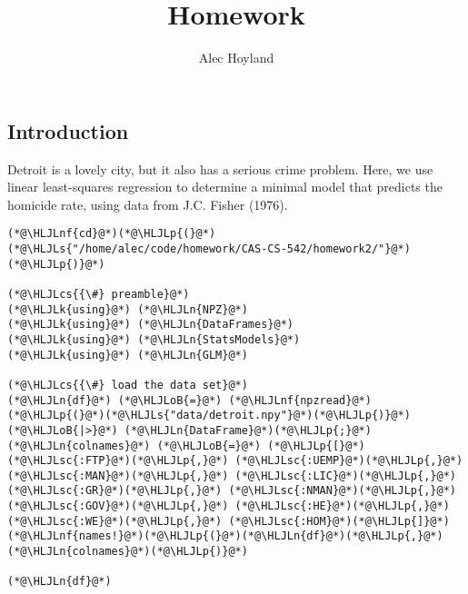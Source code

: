 \documentclass[12pt,a4paper]{article}
\title{ Homework }
\author{ Alec Hoyland }
\newcommand{\HLJLk}[1]{\textcolor[RGB]{148,91,176}{\textbf{#1}}}
\newcommand{\HLJLn}[1]{#1}
\newcommand{\HLJLnf}[1]{\textcolor[RGB]{66,102,213}{#1}}
\newcommand{\HLJLs}[1]{\textcolor[RGB]{201,61,57}{#1}}
\newcommand{\HLJLsc}[1]{\textcolor[RGB]{201,61,57}{#1}}
\newcommand{\HLJLoB}[1]{\textcolor[RGB]{102,102,102}{\textbf{#1}}}
\newcommand{\HLJLp}[1]{#1}
\newcommand{\HLJLcs}[1]{\textcolor[RGB]{153,153,119}{\textit{#1}}}
\begin{document}
\maketitle


\subsection{Introduction}
Detroit is a lovely city, but it also has a serious crime problem. Here, we use linear least-squares regression to determine a minimal model that predicts the homicide rate, using data from J.C. Fisher (1976).


\begin{lstlisting}
(*@\HLJLnf{cd}@*)(*@\HLJLp{(}@*)(*@\HLJLs{"/home/alec/code/homework/CAS-CS-542/homework2/"}@*)(*@\HLJLp{)}@*)

(*@\HLJLcs{{\#} preamble}@*)
(*@\HLJLk{using}@*) (*@\HLJLn{NPZ}@*)
(*@\HLJLk{using}@*) (*@\HLJLn{DataFrames}@*)
(*@\HLJLk{using}@*) (*@\HLJLn{StatsModels}@*)
(*@\HLJLk{using}@*) (*@\HLJLn{GLM}@*)

(*@\HLJLcs{{\#} load the data set}@*)
(*@\HLJLn{df}@*) (*@\HLJLoB{=}@*) (*@\HLJLnf{npzread}@*)(*@\HLJLp{(}@*)(*@\HLJLs{"data/detroit.npy"}@*)(*@\HLJLp{)}@*) (*@\HLJLoB{|>}@*) (*@\HLJLn{DataFrame}@*)(*@\HLJLp{;}@*)
(*@\HLJLn{colnames}@*) (*@\HLJLoB{=}@*) (*@\HLJLp{[}@*)(*@\HLJLsc{:FTP}@*)(*@\HLJLp{,}@*) (*@\HLJLsc{:UEMP}@*)(*@\HLJLp{,}@*) (*@\HLJLsc{:MAN}@*)(*@\HLJLp{,}@*) (*@\HLJLsc{:LIC}@*)(*@\HLJLp{,}@*) (*@\HLJLsc{:GR}@*)(*@\HLJLp{,}@*) (*@\HLJLsc{:NMAN}@*)(*@\HLJLp{,}@*) (*@\HLJLsc{:GOV}@*)(*@\HLJLp{,}@*) (*@\HLJLsc{:HE}@*)(*@\HLJLp{,}@*) (*@\HLJLsc{:WE}@*)(*@\HLJLp{,}@*) (*@\HLJLsc{:HOM}@*)(*@\HLJLp{]}@*)
(*@\HLJLnf{names!}@*)(*@\HLJLp{(}@*)(*@\HLJLn{df}@*)(*@\HLJLp{,}@*) (*@\HLJLn{colnames}@*)(*@\HLJLp{)}@*)

(*@\HLJLn{df}@*)
\end{lstlisting}
\end{document}
